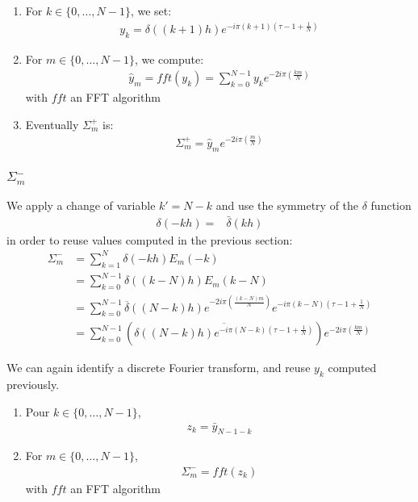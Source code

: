 \begin{enumerate}
\item For $k\in\{0,\hdots,N-1\}$, we set:
\begin{align}
y_{k}=\delta((k+1)h)e^{-i\pi (k+1)\left(\tau-1+\frac{1}{N}\right)}
\end{align}
\item For $m \in\{0,\hdots,N-1\}$, we compute:
\begin{align}
  \widehat{y}_{m}=fft(y_{k})=\sum_{k=0}^{N-1} y_k e^{-2i\pi\left(\frac{k m}{N}\right)} 
\end{align}
with $fft$ an FFT algorithm
\item Eventually $\Sigma_{m}^{+}$ is:
\begin{align*}
  \Sigma_{m}^{+}=\widehat{y}_{m}e^{-2i\pi\left(\frac{m}{N}\right)}
\end{align*}
\end{enumerate}

\subsubsection{\texorpdfstring{$\Sigma_{m}^{-}$}{sigma-}}

We apply a change of variable $k'=N-k$ and use the symmetry of the $\delta$ function
\begin{align*}
\delta(-kh)=&\bar{\delta}(kh)
\end{align*}
in order to reuse values computed in the previous section:
\begin{align*}
\Sigma_{m}^{-}&=\sum_{k=1}^{N}\delta(-kh)E_{m}(-k)\\
  &=\sum_{k=0}^{N-1}\delta((k-N)h)E_{m}(k-N)\\
  &=\sum_{k=0}^{N-1}\overline{\delta}((N-k)h) e^{-2i\pi\left(\frac{(k-N) m}{N}\right)}e^{-i\pi (k-N)\left(\tau-1+\frac{1}{N}\right)}\\
  &=\sum_{k=0}^{N-1}\left(\overline{\delta((N-k)h) e^{-i\pi (N-k)\left(\tau-1+\frac{1}{N}\right)}}\right) e^{-2i\pi\left(\frac{k m}{N}\right)} 
\end{align*}

We can again identify a discrete Fourier transform, and reuse $y_k$ computed previously.
\begin{enumerate}
\item Pour $k\in\{0,\hdots,N-1\}$,
\begin{align}
z_{k}= \bar{y}_{N-1-k}
\end{align}
\item For $m \in\{0,\hdots,N-1\}$,
\begin{align}
  \Sigma_{m}^{-}=fft(z_{k})
\end{align}
with $fft$ an FFT algorithm
\end{enumerate}

